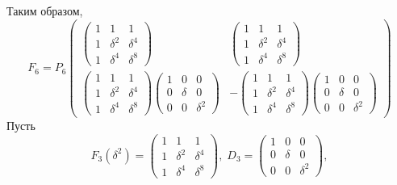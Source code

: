 Таким образом,
\[
    F_6
    = P_6
    \begin{pmatrix}
        \begin{pmatrix}
            1 & 1        & 1        \\
            1 & \delta^2 & \delta^4 \\
            1 & \delta^4 & \delta^8
        \end{pmatrix}
         &
        \begin{pmatrix}
            1 & 1        & 1        \\
            1 & \delta^2 & \delta^4 \\
            1 & \delta^4 & \delta^8
        \end{pmatrix}
        \\
        \begin{pmatrix}
            1 & 1        & 1        \\
            1 & \delta^2 & \delta^4 \\
            1 & \delta^4 & \delta^8
        \end{pmatrix}
        \begin{pmatrix}
            1 & 0      & 0        \\
            0 & \delta & 0        \\
            0 & 0      & \delta^2
        \end{pmatrix}
         &
        -
        \begin{pmatrix}
            1 & 1        & 1        \\
            1 & \delta^2 & \delta^4 \\
            1 & \delta^4 & \delta^8
        \end{pmatrix}
        \begin{pmatrix}
            1 & 0      & 0        \\
            0 & \delta & 0        \\
            0 & 0      & \delta^2
        \end{pmatrix}
    \end{pmatrix}
\]
Пусть
\[
    F_3(\delta^2)
    = \begin{pmatrix}
        1 & 1        & 1        \\
        1 & \delta^2 & \delta^4 \\
        1 & \delta^4 & \delta^8
    \end{pmatrix},
    \;
    D_3
    = \begin{pmatrix}
        1 & 0      & 0        \\
        0 & \delta & 0        \\
        0 & 0      & \delta^2
    \end{pmatrix} ,
\]
